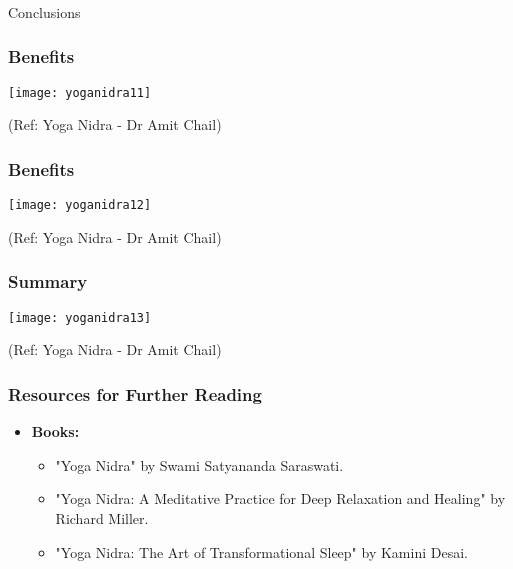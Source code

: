 \begin{frame}[fragile]\frametitle{}
\begin{center}
{\Large Conclusions}
\end{center}
\end{frame}



\begin{frame}[fragile]\frametitle{Benefits}
      \begin{center}
        \texttt{[image: yoganidra11]}

		{\tiny (Ref: Yoga Nidra - Dr Amit Chail)}		
        \end{center}

\end{frame}

\begin{frame}[fragile]\frametitle{Benefits}
      \begin{center}
        \texttt{[image: yoganidra12]}

		{\tiny (Ref: Yoga Nidra - Dr Amit Chail)}		
        \end{center}

\end{frame}

\begin{frame}[fragile]\frametitle{Summary}
      \begin{center}
        \texttt{[image: yoganidra13]}

		{\tiny (Ref: Yoga Nidra - Dr Amit Chail)}		
        \end{center}

\end{frame}

\begin{frame}[fragile]\frametitle{Resources for Further Reading}
    \begin{itemize}
        \item \textbf{Books:}
        \begin{itemize}
            \item "Yoga Nidra" by Swami Satyananda Saraswati.
            \item "Yoga Nidra: A Meditative Practice for Deep Relaxation and Healing" by Richard Miller.
            \item "Yoga Nidra: The Art of Transformational Sleep" by Kamini Desai.
        \end{itemize}
    \end{itemize}
\end{frame}